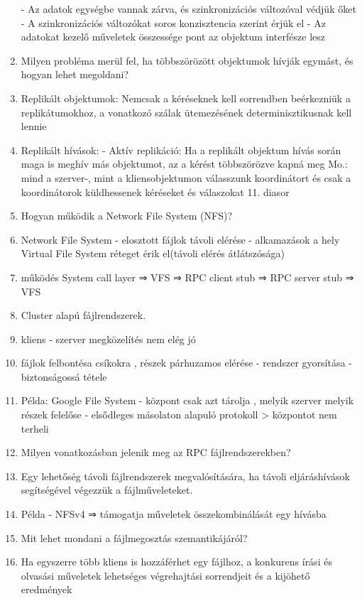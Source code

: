 \documentclass[twoside, a4paper, 12pt]{article}
\begin{document}
\begin{enumerate}
        - Az adatok egységbe vannak zárva, és szinkronizációs változóval védjük őket
        - A szinkronizációs változókat soros konzisztencia szerint érjük el
        - Az adatokat kezelő műveletek összessége pont az objektum interfésze lesz
    \item  Milyen probléma merül fel, ha többszörözött objektumok hívják
        egymást, és hogyan lehet megoldani?  
    \item Replikált objektumok: Nemcsak a kéréseknek kell sorrendben beérkezniük a replikátumokhoz, a vonatkozó szálak ütemezésének
        determinisztikusnak kell lennie
    \item Replikált hívások:
        - Aktív replikáció: Ha a replikált objektum hívás során maga is meghív más objektumot, az a kérést többszörözve kapná meg
        Mo.: mind a szerver-, mint a kliensobjektumon válasszunk koordinátort és csak a koordinátorok küldhessenek kéréseket és válaszokat
        11. diasor
    \item  Hogyan működik a Network File System (NFS)?
    \item Network File System
        - elosztott fájlok távoli elérése
        - alkamazások a hely Virtual File System réteget érik el(távoli elérés átlátszósága)
    \item működés
        System call layer ⇒ VFS ⇒ RPC client stub ⇒ RPC server stub ⇒ VFS 
    \item  Cluster alapú fájlrendszerek.  
    \item kliens - szerver megközelítés nem elég jó 
    \item fájlok felbontésa csíkokra , részek párhuzamos elérése
        - rendszer gyorsítása
        - biztonságossá tétele
    \item Példa: Google File System
        - központ csak azt tárolja , melyik szerver melyik részek felelőse
        - elsődleges másolaton alapuló protokoll
        > központot nem terheli
    \item  Milyen vonatkozásban jelenik meg az RPC fájlrendszerekben?
    \item Egy lehetőség távoli fájlrendszerek megvalósítására, ha távoli eljáráshívások segítségével végezzük a fájlműveleteket.
    \item Példa
        - NFSv4 ⇒ támogatja műveletek összekombinálását egy hívásba
    \item  Mit lehet mondani a fájlmegosztás szemantikájáról?  
    \item Ha egyszerre több kliens is hozzáférhet egy fájlhoz, a konkurens írási és olvasási műveletek lehetséges végrehajtási sorrendjeit és a kijöhető eredmények

\end{enumerate}
\end{document}
